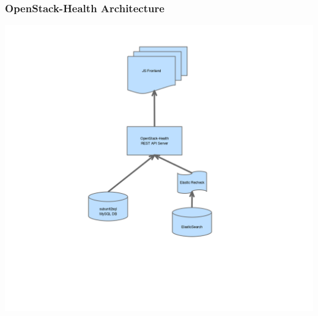 \documentclass[aspectratio=169,11pt,hyperref={colorlinks=true}]{beamer}
\begin{document}
\begin{frame}
    \frametitle{OpenStack-Health Architecture}
    \begin{center}
        \includegraphics[height=1.1\textheight]{openstack-health-arch.png}
    \end{center}
\end{frame}
\end{document}
